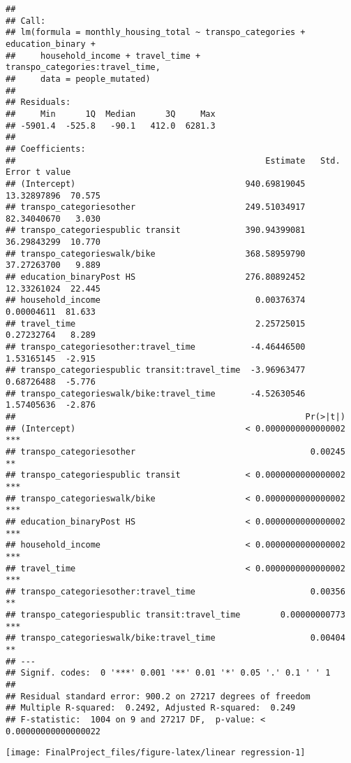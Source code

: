 \documentclass[
]{article}
\begin{document}
\begin{verbatim}
## 
## Call:
## lm(formula = monthly_housing_total ~ transpo_categories + education_binary + 
##     household_income + travel_time + transpo_categories:travel_time, 
##     data = people_mutated)
## 
## Residuals:
##     Min      1Q  Median      3Q     Max 
## -5901.4  -525.8   -90.1   412.0  6281.3 
## 
## Coefficients:
##                                                  Estimate   Std. Error t value
## (Intercept)                                  940.69819045  13.32897896  70.575
## transpo_categoriesother                      249.51034917  82.34040670   3.030
## transpo_categoriespublic transit             390.94399081  36.29843299  10.770
## transpo_categorieswalk/bike                  368.58959790  37.27263700   9.889
## education_binaryPost HS                      276.80892452  12.33261024  22.445
## household_income                               0.00376374   0.00004611  81.633
## travel_time                                    2.25725015   0.27232764   8.289
## transpo_categoriesother:travel_time           -4.46446500   1.53165145  -2.915
## transpo_categoriespublic transit:travel_time  -3.96963477   0.68726488  -5.776
## transpo_categorieswalk/bike:travel_time       -4.52630546   1.57405636  -2.876
##                                                          Pr(>|t|)    
## (Intercept)                                  < 0.0000000000000002 ***
## transpo_categoriesother                                   0.00245 ** 
## transpo_categoriespublic transit             < 0.0000000000000002 ***
## transpo_categorieswalk/bike                  < 0.0000000000000002 ***
## education_binaryPost HS                      < 0.0000000000000002 ***
## household_income                             < 0.0000000000000002 ***
## travel_time                                  < 0.0000000000000002 ***
## transpo_categoriesother:travel_time                       0.00356 ** 
## transpo_categoriespublic transit:travel_time        0.00000000773 ***
## transpo_categorieswalk/bike:travel_time                   0.00404 ** 
## ---
## Signif. codes:  0 '***' 0.001 '**' 0.01 '*' 0.05 '.' 0.1 ' ' 1
## 
## Residual standard error: 900.2 on 27217 degrees of freedom
## Multiple R-squared:  0.2492, Adjusted R-squared:  0.249 
## F-statistic:  1004 on 9 and 27217 DF,  p-value: < 0.00000000000000022
\end{verbatim}

\begin{center}\texttt{[image: FinalProject\_files/figure-latex/linear regression-1]} \end{center}
\end{document}
